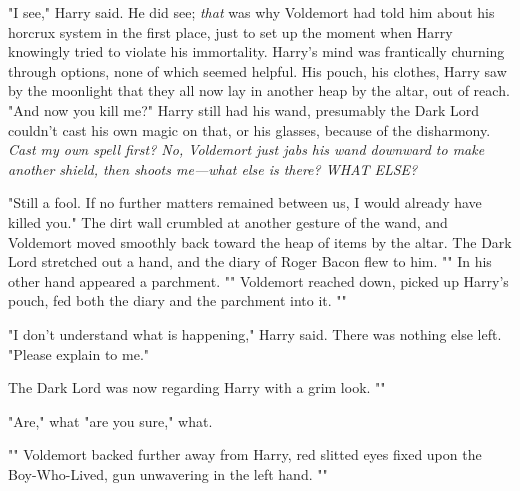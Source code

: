 "I see," Harry said. He did see; \emph{that} was why Voldemort had told him
about his horcrux system in the first place, just to set up the moment when
Harry knowingly tried to violate his immortality. Harry's mind was frantically
churning through options, none of which seemed helpful. His pouch, his clothes,
Harry saw by the moonlight that they all now lay in another heap by the altar,
out of reach. "And now you kill me?" Harry still had his wand, presumably the
Dark Lord couldn't cast his own magic on that, or his glasses, because of the
disharmony. \emph{Cast my own spell first? No, Voldemort just jabs his wand
downward to make another shield, then shoots me---what else is there? WHAT
ELSE?}

"Still a fool. If no further matters remained between us, I would already have
killed you." The dirt wall crumbled at another gesture of the wand, and
Voldemort moved smoothly back toward the heap of items by the altar. The Dark
Lord stretched out a hand, and the diary of Roger Bacon flew to him.
"" In
his other hand appeared a parchment. "" Voldemort reached down, picked up Harry's pouch, fed both
the diary and the parchment into it. ""

"I don't understand what is happening," Harry said. There was nothing else
left. "Please explain to me."

The Dark Lord was now regarding Harry with a grim look. ""

"Are," what "are you sure," what.

"" Voldemort backed further away
from Harry, red slitted eyes fixed upon the Boy-Who-Lived, gun unwavering in
the left hand. ""

